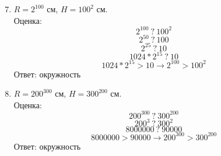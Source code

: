     \begin{minipage}[t]{0.5\textwidth}
        \begin{enumerate}
            \setcounter{enumi}{6}
            \item $R = 2 ^ {100}$ см, $H = 100 ^ 2$ см.\\
            Оценка:
            \[ 2 ^ {100} \ ? \ 100 ^ 2  \]
            \[ 2 ^ {50} \ ? \ 100 \]
            \[2 ^ {25} \ ? \ 10\]
            \[1024 * 2 ^ {15} \ ? \ 10 \]
            \[1024 * 2 ^ {15} > 10 \rightarrow 2 ^ {100} > 100 ^ 2  \]
            Ответ: окружность

            \item $R = 200 ^ {300}$ см, $H = 300 ^ {200}$ см.\\
            Оценка:
            \[
                200 ^ {300} \ ? \ 300 ^ {200}
            \]
            \[ 200 ^ {3} \ ? \ 300 ^ {2}\]
            \[ 8000000 \ ? \ 90000\]
            \[ 8000000 > 90000 \rightarrow 200 ^ {300} > 300 ^ {200}\]
            Ответ: окружность
        \end{enumerate}
    \end{minipage}
